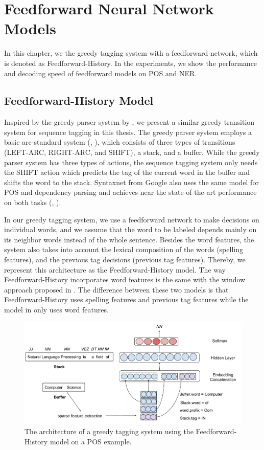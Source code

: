 
\chapter{Feedforward Neural Network Models}

In this chapter, we the greedy tagging system with a feedforward network, which is denoted as Feedforward-History. In the experiments, we show the performance and decoding speed of feedforward models on POS and NER. 

\section{Feedforward-History Model}

Inspired by the greedy parser system by \cite{chen2014fast}, we present a similar greedy transition system for sequence tagging in this thesis. The greedy parser system employs a basic arc-standard system (\citeauthor{nivre2004deterministic}, \citeyear{nivre2004deterministic}), which consists of three types of transitions (LEFT-ARC, RIGHT-ARC, and SHIFT), a stack, and a buffer. While the greedy parser system has three types of actions, the sequence tagging system only needs the SHIFT action which predicts the tag of the current word in the buffer and shifts the word to the stack.  Syntaxnet from Google also uses the same model for POS and dependency parsing and achieves near the state-of-the-art performance on both tasks (\citeauthor{alberti2017syntaxnet}, \citeyear{alberti2017syntaxnet}).

In our greedy tagging system, we use a feedforward network to make decisions on individual words, and we assume that the word to be labeled depends mainly on its neighbor words instead of the whole sentence. Besides the word features, the system also takes into account the lexical composition of the words (spelling features), and the previous tag decisions (previous tag features). Thereby, we represent this architecture as the Feedforward-History model. The way Feedforward-History incorporates word features is the same with the window approach proposed in \cite{collobert2011natural}. The difference between these two models is that Feedforward-History uses spelling features and previous tag features while the model in \cite{collobert2011natural} only uses word features.

\begin{figure}
  \centering
  \includegraphics[scale=0.6]{greedypos.pdf}
 \caption{The architecture of a greedy tagging system using the Feedforward-History model on a POS example.}
  \label{fig:greedypos}
\end{figure}

